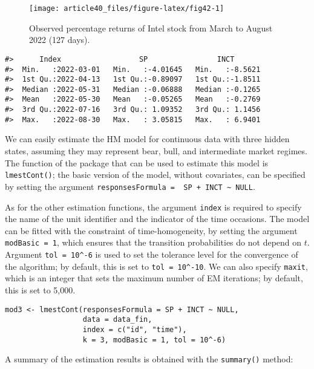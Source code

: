 \begin{figure}

{\centering \texttt{[image: article40\_files/figure-latex/fig42-1]} 

}

\caption{Observed percentage returns of Intel stock from March to August 2022  (127 days).}\label{fig:fig42}
\end{figure}

\begin{verbatim}
#>      Index                  SP                INCT        
#>  Min.   :2022-03-01   Min.   :-4.01645   Min.   :-8.5621  
#>  1st Qu.:2022-04-13   1st Qu.:-0.89097   1st Qu.:-1.8511  
#>  Median :2022-05-31   Median :-0.06888   Median :-0.1265  
#>  Mean   :2022-05-30   Mean   :-0.05265   Mean   :-0.2769  
#>  3rd Qu.:2022-07-16   3rd Qu.: 1.09352   3rd Qu.: 1.1456  
#>  Max.   :2022-08-30   Max.   : 3.05815   Max.   : 6.9401
\end{verbatim}

We can easily estimate the HM model for continuous data with three
hidden states, assuming they may represent bear, bull, and intermediate
market regimes. The function of the package that can be used to estimate
this model is \texttt{lmestCont()}; the basic version of the model, without
covariates, can be specified by setting the argument
\texttt{responsesFormula\ =\ \ SP\ +\ INCT\ \textasciitilde{}\ NULL}.

As for the other estimation functions, the argument \texttt{index} is required
to specify the name of the unit identifier and the indicator of the time occasions. The
model can be fitted with the constraint of time-homogeneity, by setting
the argument \texttt{modBasic\ =\ 1}, which ensures that the transition
probabilities do not depend on \(t\). Argument \texttt{tol\ =\ 10\^{}-6} is used to
set the tolerance level for the convergence of the algorithm; by
default, this is set to \texttt{tol\ =\ 10\^{}-10}. We can also specify \texttt{maxit},
which is an integer that sets the maximum number of EM iterations; by
default, this is set to 5,000.

\begin{verbatim}
mod3 <- lmestCont(responsesFormula = SP + INCT ~ NULL,
                  data = data_fin,
                  index = c("id", "time"),
                  k = 3, modBasic = 1, tol = 10^-6)
\end{verbatim}

A summary of the estimation results is obtained with the \texttt{summary()}
method:

